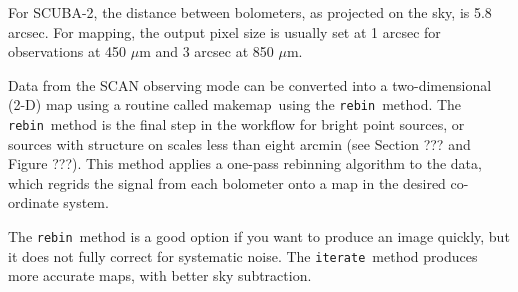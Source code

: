 \documentclass[twoside,11pt]{article}
\newcommand{\xref}[3]{#1}
\renewcommand{\_}{\texttt{\symbol{95}}}
\newcommand{\task}[1]{\textsf{#1}}
\newcommand{\makemap}{\xref{\task{makemap}}{sun258}{MAKEMAP}}
\newcommand{\rebin}{\texttt{rebin}}
\newcommand{\iterate}{\texttt{iterate}}
\begin{document}
For SCUBA-2, the distance between bolometers, as projected on the sky,
is 5.8 arcsec. For mapping, the output pixel size is usually set at 1
arcsec for observations at 450 $\mu$m and 3 arcsec at 850 $\mu$m.

Data from the SCAN observing mode can be converted into a
two-dimensional (2-D) map using a routine called \makemap\ using the
\rebin\ method.  The \rebin\ method is the final step in the workflow
for bright point sources, or sources with structure on scales less
than eight arcmin (see Section ??? and Figure ???). This method
applies a one-pass rebinning algorithm to the data, which regrids the
signal from each bolometer onto a map in the desired co-ordinate
system.

The \rebin\ method is a good option if you want to produce an image
quickly, but it does not fully correct for systematic noise. The
\iterate\ method produces more accurate maps, with better sky
subtraction.
\end{document}
